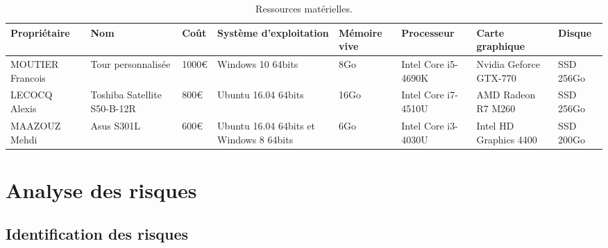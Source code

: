 \documentclass[]{article}
\begin{document}
\begin{table}[!htbp]
\begin{center}
\begin{tabular}{p{2cm}|p{2cm}|p{1cm}|p{2cm}|p{1.5cm}|p{2cm}|p{2cm}|p{1cm}}
	\textbf{Propriétaire} & \textbf{Nom} & \textbf{Coût} & \textbf{Système d'exploitation} & \textbf{Mémoire vive} & \textbf{Processeur} & \textbf{Carte graphique} & \textbf{Disque}\\
	\hline
	MOUTIER Francois & Tour personnalisée & 1000\euro & Windows 10 64bits & 8Go & Intel Core i5-4690K & Nvidia Geforce GTX-770& SSD 256Go\\
	\hline
	LECOCQ Alexis & Toshiba Satellite S50-B-12R& 800\euro & Ubuntu 16.04 64bits & 16Go & Intel Core i7-4510U & AMD Radeon R7 M260 & SSD 256Go\\
	\hline
	MAAZOUZ Mehdi & Asus S301L & 600\euro & Ubuntu 16.04 64bits et Windows 8 64bits& 6Go & Intel Core i3-4030U & Intel HD Graphics 4400 & SSD 200Go\\
\end{tabular}
\end{center}
\caption{Ressources matérielles.}
\label{tab:RM}
\end{table}

\newpage
\section{Analyse des risques}
\subsection{Identification des risques}\label{sec:riskident}
\end{document}

